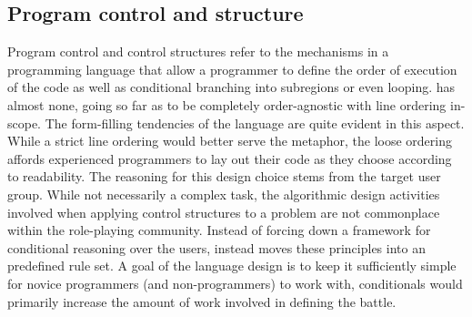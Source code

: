 \subsection{Program control and structure}
Program control and control structures refer to the mechanisms in a programming language that allow a programmer to define the order of execution of the code as well as conditional branching into subregions or even looping. \langname{} has almost none, going so far as to be completely order-agnostic with line ordering in-scope. 
The form-filling tendencies of the language are quite evident in this aspect. While a strict line ordering would better serve the metaphor, the loose ordering %
affords experienced programmers to lay out their code as they choose according to readability. %
The reasoning for this design choice stems from the target user group. While not necessarily a complex task, the algorithmic design activities involved when applying control structures to a problem are not commonplace within the role-playing community. Instead of forcing down a framework for conditional reasoning over the users, \langname{} instead moves these principles into an predefined rule set.
A goal of the language design is to keep it sufficiently simple for novice programmers (and non-programmers) to work with, conditionals would primarily increase the amount of work involved in defining the battle. %
